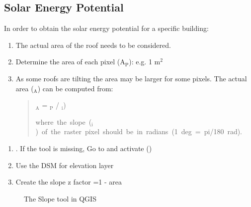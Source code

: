 \documentclass[letterpaper,10pt,english]{sphinxmanual}
\begin{document}
\subsection{Solar Energy Potential}
\label{\detokenize{Tutorials/SEBE:solar-energy-potential}}
In order to obtain the solar energy potential for a specific building:
\begin{enumerate}
\item {} 
The actual area of the roof needs to be considered.

\item {} 
Determine the area of each pixel (A$_{\text{P}}$): e.g. 1 m$^{\text{2}}$

\item {} 
As some roofs are tilting the area may be larger for some pixels. The
actual area ($_{\text{A}}$) can be computed from:
\begin{quote}

$_{\text{A}}$ = $_{\text{P}}$ / $_{\text{i}}$)

where the slope ($_{\text{i}}$) of the raster pixel should be in radians (1 deg = pi/180 rad).
\end{quote}

\end{enumerate}

\begin{enumerate}
\item {} 
. If the tool is missing, Go to
 and activate ()

\item {} 
Use the DSM for elevation layer

\item {} 
Create the slope z factor =1 - area

\end{enumerate}

\begin{figure}[htbp]
\centering
\capstart

\noindent{}
\caption{The Slope tool in QGIS}\label{\detokenize{Tutorials/SEBE:id6}}\end{figure}
\end{document}
